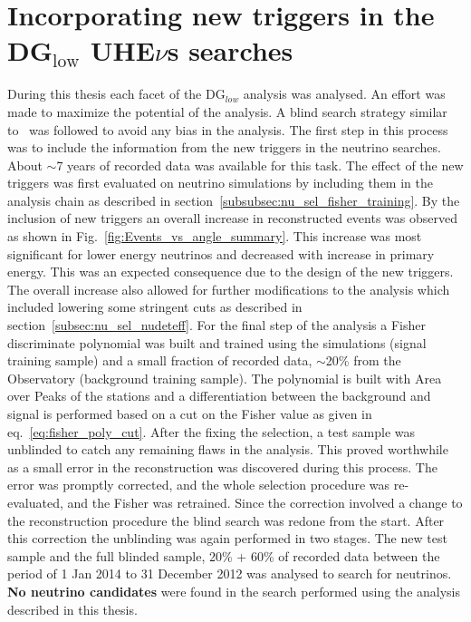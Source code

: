 \section*{Incorporating new triggers in the DG$\mathrm{_{low}}$ UHE$\nu$s searches}
During this thesis each facet of the DG$_{low}$ analysis was analysed. An effort was made to maximize the potential of the analysis. A blind search strategy similar to~\cite{gap_note_2013,Aab_2019_diffuse} was followed to avoid any bias in the analysis. The first step in this process was to include the information from the new triggers in the neutrino searches. About $\sim$7 years of recorded data was available for this task. The effect of the new triggers was first evaluated on neutrino simulations by including them in the analysis chain as described in section~\ref{subsubsec:nu_sel_fisher_training}. By the inclusion of new triggers an overall increase in reconstructed events was observed as shown in Fig.~\ref{fig:Events_vs_angle_summary}. This increase was most significant for lower energy neutrinos and decreased with increase in primary energy. This was an expected consequence due to the design of the new triggers. The overall increase also allowed for further modifications to the analysis which included lowering some stringent cuts as described in section~\ref{subsec:nu_sel_nudeteff}. For the final step of the analysis a Fisher discriminate polynomial was built and trained using the simulations (signal training sample) and a small fraction of recorded data, $\sim$20\% from the Observatory (background training sample). The polynomial is built with Area over Peaks of the stations and a differentiation between the background and signal is performed based on a cut on the Fisher value as given in eq.~\ref{eq:fisher_poly_cut}.
After the fixing the selection, a test sample was unblinded to catch any remaining flaws in the analysis. This proved worthwhile as a small error in the reconstruction was discovered during this process. The error was promptly corrected, and the whole selection procedure was re-evaluated, and the Fisher was retrained. Since the correction involved a change to the reconstruction procedure the blind search was redone from the start. After this correction the unblinding was again performed in two stages. The new test sample and the full blinded sample, 20\% + 60\% of recorded data between the period of 1 Jan 2014 to 31 December 2012 was analysed to search for neutrinos. \textbf{No neutrino candidates} were found in the search performed using the analysis described in this thesis. 

